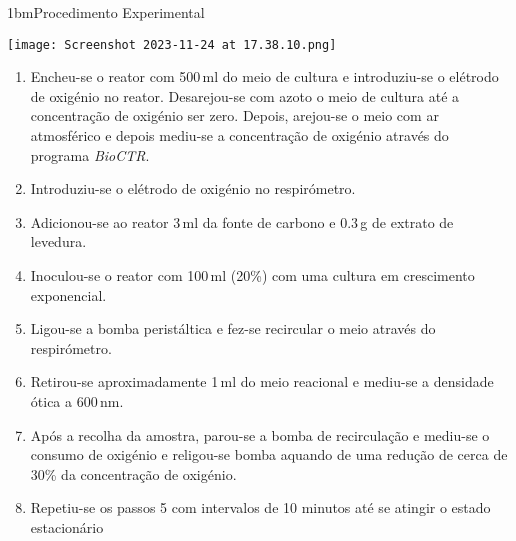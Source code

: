 \documentclass[\mainfilename]{subfiles}
\begin{document}
\begin{sectionBox}1bm{Procedimento Experimental} %
    \begin{center}
        \texttt{[image: Screenshot 2023-11-24 at 17.38.10.png]}
    \end{center}
    
    \begin{enumerate}
        \item Encheu-se o reator com 500\,\si{\milli\litre} do meio de cultura e introduziu-se o elétrodo de oxigénio no reator. Desarejou-se com azoto o meio de cultura até a concentração de oxigénio ser zero. Depois, arejou-se o meio com ar atmosférico e depois mediu-se a concentração de oxigénio através do programa \textit{BioCTR}. 
        \item Introduziu-se o elétrodo de oxigénio no respirómetro. 
        \item Adicionou-se ao reator 3\,\si{\milli\litre} da fonte de  carbono e 0.3\,\si{\gram} de extrato de levedura. 
        \item Inoculou-se o reator com 100\,\si{\milli\litre} (20\%) com uma cultura em crescimento exponencial.
        \item Ligou-se a bomba peristáltica e fez-se recircular o meio através do respirómetro. 
        \item Retirou-se aproximadamente 1\,\si{\milli\litre} do meio reacional e mediu-se a densidade ótica a 600\,\si{\nano\metre}. 
        \item Após a recolha da amostra, parou-se a bomba de recirculação e mediu-se o consumo de oxigénio e religou-se bomba aquando de uma redução de cerca de 30\% da concentração de oxigénio. 
        \item Repetiu-se os passos 5 com intervalos de 10 minutos até se atingir o estado estacionário
    \end{enumerate}


\end{sectionBox}
\end{document}
